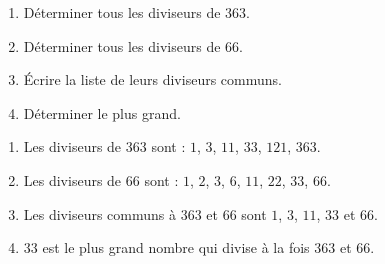 \begin{exercice*}
    \begin{enumerate}
        \item Déterminer tous les diviseurs de $363$.
        \item Déterminer tous les diviseurs de $66$.
        \item Écrire la liste de leurs diviseurs communs.
        \item Déterminer le plus grand.
    \end{enumerate}
\end{exercice*}
\begin{corrige}
    \begin{enumerate}
        \item Les diviseurs de $363$ sont : $1$, $3$, $11$, $33$, $121$, $363$.
        \item Les diviseurs de 66 sont : $1$, $2$, $3$, $6$, $11$, $22$, $33$, $66$.
        \item Les diviseurs communs à $363$ et $66$ sont $1$, $3$, $11$, $33$ et $66$.
        \item $33$ est le plus grand nombre qui divise à la fois $363$ et $66$.
    \end{enumerate}
\end{corrige}

